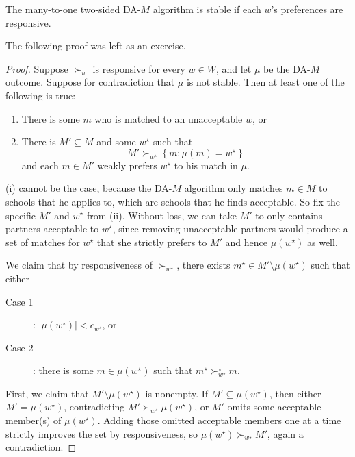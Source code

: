 \begin{proposition}
	The many-to-one two-sided DA-$M$ algorithm is stable if each $w$'s preferences are responsive.
\end{proposition}
The following proof was left as an exercise.
\begin{proof}
	Suppose $\succ_w$ is responsive for every $w \in W$, and let $\mu$ be the DA-$M$ outcome. Suppose for contradiction that $\mu$ is not stable. Then at least one of the following is true:
	\begin{enumerate}[label = (\roman*)]
		\item There is some $m$ who is matched to an unacceptable $w$, or
		\item There is $M' \subseteq M$ and some $w^\star$ such that \[
			M' \succ_{w^\star} \left\{m: \mu(m) = w^\star\right\}
		\] and each $m \in M'$ weakly prefers $w^\star$ to his match in $\mu$.
	\end{enumerate}
	(i) cannot be the case, because the DA-$M$ algorithm only matches $m\in M$ to schools that he applies to, which are schools that he finds acceptable. So fix the specific $M'$ and $w^\star$ from (ii). Without loss, we can take $M'$ to only contains partners acceptable to $w^\star$, since removing unacceptable partners would produce a set of matches for $w^\star$ that she strictly prefers to $M'$ and hence $\mu(w^\star)$ as well.

	We claim that by responsiveness of $\succ_{w^\star}$, there exists $m^\star \in M' \setminus \mu(w^\star)$ such that either 
	\begin{description}
		\item[{Case 1}]: $\left| \mu(w^\star) \right| < c_{w^\star}$, or 
		\item[{Case 2}]: there is some $m \in \mu(w^\star)$ such that $m^\star \succ_{w^\star}^\star m$.
	\end{description}
	First, we claim that \(M' \setminus \mu(w^\star)\) is nonempty. If \(M' \subseteq \mu(w^\star)\), then either \(M'=\mu(w^\star)\), contradicting
	\(M' \succ_{w^\star} \mu(w^\star)\), or \(M'\) omits some acceptable member(s) of \(\mu(w^\star)\). Adding those omitted acceptable members one at a time strictly improves the set by responsiveness, so \(\mu(w^\star) \succ_{w^\star} M'\), again a contradiction.


\end{proof}
